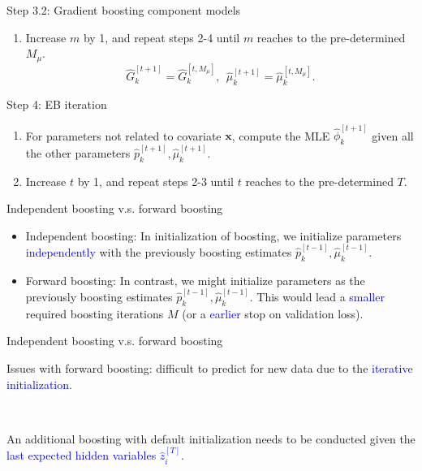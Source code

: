 \documentclass[professionalfont]{beamer}
\newcounter{saveenumi}
\newcommand{\conti}{\setcounter{enumi}{\value{saveenumi}}}
\def\bx{\boldsymbol{x}}
\newcommand{\blue}[1]{\textcolor{blue}{#1}}
\begin{document}
\begin{frame}{Step 3.2: Gradient boosting component models}
	\begin{enumerate}
		\conti
		\item Increase $m$ by 1, and repeat steps 2-4 until $m$ reaches to the pre-determined $M_\mu$.
		$$\hat{G}_k^{[t+1]}=\hat{G}_k^{[t,M_\mu]},~~\hat{\mu}_k^{[t+1]}=\hat{\mu}_k^{[t,M_\mu]}.$$
	\end{enumerate}

\end{frame}

\begin{frame}{Step 4: EB iteration}
	\begin{enumerate}
		\item For parameters not related to covariate $\bx$, compute the MLE $\hat{\phi}_k^{[t+1]}$ given all the other parameters $\hat{p}_k^{[t+1]}, \hat{\mu}_k^{[t+1]}$.
		\item Increase $t$ by 1, and repeat steps 2-3 until $t$
		reaches to the pre-determined $T$.
	\end{enumerate}
\end{frame}

\begin{frame}{Independent boosting v.s. forward boosting}
\begin{itemize}
	\item Independent boosting:
	In initialization of boosting, we initialize parameters \blue{independently} with the previously boosting estimates $\hat{p}_k^{[t-1]}, \hat{\mu}_k^{[t-1]}$.
	\item Forward boosting:
	In contrast, we might initialize parameters as the previously boosting estimates $\hat{p}_k^{[t-1]}, \hat{\mu}_k^{[t-1]}$.
	This would lead a \blue{smaller} required boosting iterations $M$ (or a \blue{earlier} stop on validation loss).

	\end{itemize}
\end{frame}

\begin{frame}{Independent boosting v.s. forward boosting}

	Issues with forward boosting: difficult to predict for new data due to the \blue{iterative initialization}.

	~

	An additional boosting with default initialization needs to be conducted given the \blue{last expected hidden variables $\hat{z}_i^{[T]}$}.

\end{frame}
\end{document}
